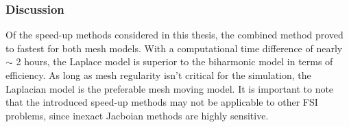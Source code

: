 \subsubsection{Discussion}
Of the speed-up methods considered in this thesis, the combined method proved to fastest for both mesh models. With a computational time difference of nearly $\sim$ 2 hours, the Laplace model is superior to the biharmonic model in terms of efficiency. As long as mesh regularity isn't critical for the simulation, the Laplacian model is the preferable mesh moving model. It is important to note that the introduced speed-up methods may not be applicable to other FSI problems, since inexact Jacboian methods are highly sensitive. 



